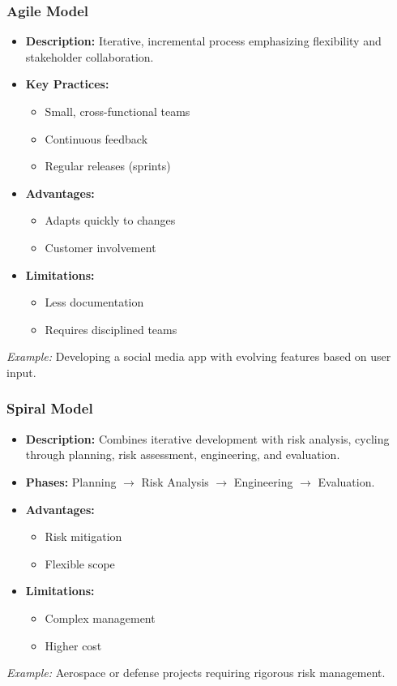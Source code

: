 \documentclass{beamer}
\begin{document}
\begin{frame}[fragile]
  \frametitle{Agile Model}
  \begin{itemize}
    \item \textbf{Description:} Iterative, incremental process emphasizing flexibility and stakeholder collaboration.
    \item \textbf{Key Practices:}
    \begin{itemize}
      \item Small, cross-functional teams
      \item Continuous feedback
      \item Regular releases (sprints)
    \end{itemize}
    \item \textbf{Advantages:}
    \begin{itemize}
      \item Adapts quickly to changes
      \item Customer involvement
    \end{itemize}
    \item \textbf{Limitations:}
    \begin{itemize}
      \item Less documentation
      \item Requires disciplined teams
    \end{itemize}
  \end{itemize}
  
  \textit{Example:} Developing a social media app with evolving features based on user input.
\end{frame}

\begin{frame}[fragile]
  \frametitle{Spiral Model}
  \begin{itemize}
    \item \textbf{Description:} Combines iterative development with risk analysis, cycling through planning, risk assessment, engineering, and evaluation.
    \item \textbf{Phases:} Planning $\rightarrow$ Risk Analysis $\rightarrow$ Engineering $\rightarrow$ Evaluation.
    \item \textbf{Advantages:}
    \begin{itemize}
      \item Risk mitigation
      \item Flexible scope
    \end{itemize}
    \item \textbf{Limitations:}
    \begin{itemize}
      \item Complex management
      \item Higher cost
    \end{itemize}
  \end{itemize}
  
  \textit{Example:} Aerospace or defense projects requiring rigorous risk management.
\end{frame}
\end{document}
